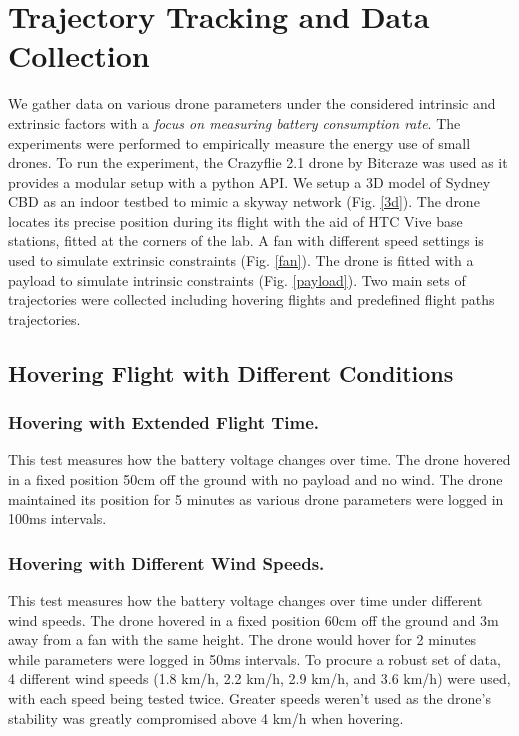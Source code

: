 \documentclass[runningheads]{llncs}
\begin{document}
\section{Trajectory Tracking and Data Collection}
\vspace{-0.3 cm}
We gather data on various drone parameters under the considered intrinsic and extrinsic factors with a \textit{focus on measuring battery consumption rate}. The experiments were performed to empirically measure the energy use of small drones. To run the experiment, the Crazyflie 2.1 drone by Bitcraze was used as it provides a modular setup with a python API. We setup a 3D model of Sydney CBD as an indoor testbed to mimic a skyway network (Fig. \ref{3d}). The drone locates its precise position during its flight with the aid of HTC Vive base stations, fitted at the corners of the lab. A fan with different speed settings is used to simulate extrinsic constraints (Fig. \ref{fan}). The drone is fitted with a payload to simulate intrinsic constraints (Fig. \ref{payload}).
Two main sets of trajectories were collected including hovering flights and predefined flight paths trajectories.
\vspace{-0.4 cm}
\subsection{Hovering Flight with Different Conditions}
\vspace{-0.1 cm}
\subsubsection{Hovering with Extended Flight Time.}
This test measures how the battery voltage changes over time. The drone hovered in a fixed position 50cm off the ground with no payload and no wind. The drone maintained its position for 5 minutes as various drone parameters were logged in 100ms intervals.
\vspace{-0.3 cm}
\subsubsection{Hovering with Different Wind Speeds.}
This test measures how the battery voltage changes over time under different wind speeds. The drone hovered in a fixed position 60cm off the ground and 3m away from a fan with the same height. The drone would hover for 2 minutes while parameters were logged in 50ms intervals. To procure a robust set of data, 4 different wind speeds (1.8 km/h, 2.2 km/h, 2.9 km/h, and 3.6 km/h) were used, with each speed being tested twice. Greater speeds weren't used as the drone's stability was greatly compromised above 4 km/h when hovering.
\vspace{-0.4 cm}
\end{document}
